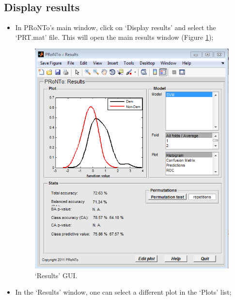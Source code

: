 
\subsection{Display results}
\label{display_results_confounds}

\begin{itemize}
	
	\item In PRoNTo's main window, click on `Display results' and select the `PRT.mat' file. This will open the main results window (Figure \ref{fig:results});
	
\begin{figure}[h!]
	\centering
		\includegraphics[scale=0.65]{images/Tutorial/confounds/results.png}
	\caption{`Results' GUI.}
	\label{fig:results}
\end{figure}
	
	
	\item In the `Results' window, one can select a different plot in the `Plots' list;

\end{itemize}
	

